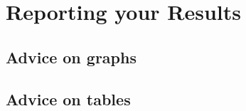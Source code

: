 \documentclass[
]{report}
\begin{document}
\hypertarget{reporting-your-results}{%
\chapter{Reporting your Results}\label{reporting-your-results}}

\hypertarget{advice-on-graphs}{%
\section{Advice on graphs}\label{advice-on-graphs}}

\hypertarget{advice-on-tables}{%
\section{Advice on tables}\label{advice-on-tables}}

  
\end{document}
